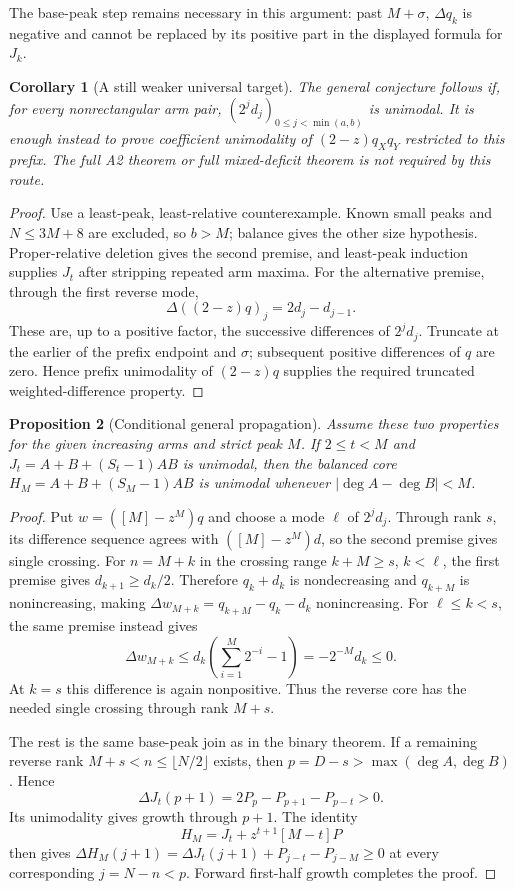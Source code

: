 \documentclass[11pt]{article}
\newtheorem{proposition}{Proposition}[section]
\newtheorem{corollary}[proposition]{Corollary}
\begin{document}
The base-peak step remains necessary in this argument: past
$M+\sigma$, $\Delta q_k$ is negative and cannot be replaced by
its positive part in the displayed formula for $J_k$.

\begin{corollary}[A still weaker universal target]
The general conjecture follows if, for every nonrectangular
arm pair, $(2^jd_j)_{0\le j<\min(a,b)}$ is unimodal.
It is enough instead to prove coefficient unimodality of
$(2-z)q_Xq_Y$ restricted to this prefix. The full A2 theorem
or full mixed-deficit theorem is not required by this route.
\end{corollary}
\begin{proof}
Use a least-peak, least-relative counterexample. Known small
peaks and $N\le3M+8$ are excluded, so $b>M$; balance gives
the other size hypothesis. Proper-relative deletion gives the
second premise, and least-peak induction supplies $J_t$ after
stripping repeated arm maxima.
For the alternative premise, through the first reverse mode,
\[
 \Delta((2-z)q)_j=2d_j-d_{j-1}.
\]
These are, up to a positive factor, the successive differences
of $2^jd_j$. Truncate at the earlier of the prefix endpoint
and $\sigma$; subsequent positive differences of $q$ are zero.
Hence prefix unimodality of $(2-z)q$ supplies the required
truncated weighted-difference property.
\end{proof}

\par\medskip

\begin{proposition}[Conditional general propagation]
Assume these two properties for the given increasing arms and
strict peak $M$. If $2\le t<M$ and
$J_t=A+B+(S_t-1)AB$ is unimodal, then the balanced core
$H_M=A+B+(S_M-1)AB$ is unimodal whenever $|\deg A-\deg B|<M$.
\end{proposition}
\begin{proof}
Put $w=([M]-z^M)q$ and choose a mode $\ell$ of $2^jd_j$.
Through rank $s$, its difference sequence agrees with
$([M]-z^M)d$, so the second premise gives single crossing.
For $n=M+k$ in the crossing range $k+M\ge s$, $k<\ell$,
the first premise gives $d_{k+1}\ge d_k/2$. Therefore
$q_k+d_k$ is nondecreasing and $q_{k+M}$ is nonincreasing,
making $\Delta w_{M+k}=q_{k+M}-q_k-d_k$ nonincreasing.
For $\ell\le k<s$, the same premise instead gives
\[
 \Delta w_{M+k}\le d_k\left(\sum_{i=1}^M2^{-i}-1\right)
                    =-2^{-M}d_k\le0.
\]
At $k=s$ this difference is again nonpositive. Thus the reverse
core has the needed single crossing through rank $M+s$.

The rest is the same base-peak join as in the binary theorem.
If a remaining reverse rank $M+s<n\le\lfloor N/2\rfloor$
exists, then $p=D-s>\max(\deg A,\deg B)$. Hence
\[
 \Delta J_t(p+1)=2P_p-P_{p+1}-P_{p-t}>0.
\]
Its unimodality gives growth through $p+1$. The identity
\[
                      H_M=J_t+z^{t+1}[M-t]P
\]
then gives $\Delta H_M(j+1)=\Delta J_t(j+1)+P_{j-t}-P_{j-M}
\ge0$ at every corresponding $j=N-n<p$.
Forward first-half growth completes the proof.
\end{proof}
\end{document}
